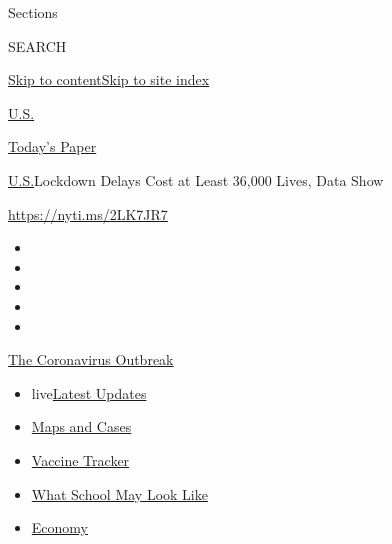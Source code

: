 Sections

SEARCH

\protect\hyperlink{site-content}{Skip to
content}\protect\hyperlink{site-index}{Skip to site index}

\href{https://www.nytimes.com/section/us}{U.S.}

\href{https://myaccount.nytimes.com/auth/login?response_type=cookie\&client_id=vi}{}

\href{https://www.nytimes.com/section/todayspaper}{Today's Paper}

\href{/section/us}{U.S.}\textbar{}Lockdown Delays Cost at Least 36,000
Lives, Data Show

\url{https://nyti.ms/2LK7JR7}

\begin{itemize}
\item
\item
\item
\item
\item
\end{itemize}

\href{https://www.nytimes.com/news-event/coronavirus?action=click\&pgtype=Article\&state=default\&region=TOP_BANNER\&context=storylines_menu}{The
Coronavirus Outbreak}

\begin{itemize}
\tightlist
\item
  live\href{https://www.nytimes.com/2020/08/02/world/coronavirus-updates.html?action=click\&pgtype=Article\&state=default\&region=TOP_BANNER\&context=storylines_menu}{Latest
  Updates}
\item
  \href{https://www.nytimes.com/interactive/2020/us/coronavirus-us-cases.html?action=click\&pgtype=Article\&state=default\&region=TOP_BANNER\&context=storylines_menu}{Maps
  and Cases}
\item
  \href{https://www.nytimes.com/interactive/2020/science/coronavirus-vaccine-tracker.html?action=click\&pgtype=Article\&state=default\&region=TOP_BANNER\&context=storylines_menu}{Vaccine
  Tracker}
\item
  \href{https://www.nytimes.com/interactive/2020/07/29/us/schools-reopening-coronavirus.html?action=click\&pgtype=Article\&state=default\&region=TOP_BANNER\&context=storylines_menu}{What
  School May Look Like}
\item
  \href{https://www.nytimes.com/live/2020/07/31/business/stock-market-today-coronavirus?action=click\&pgtype=Article\&state=default\&region=TOP_BANNER\&context=storylines_menu}{Economy}
\end{itemize}

